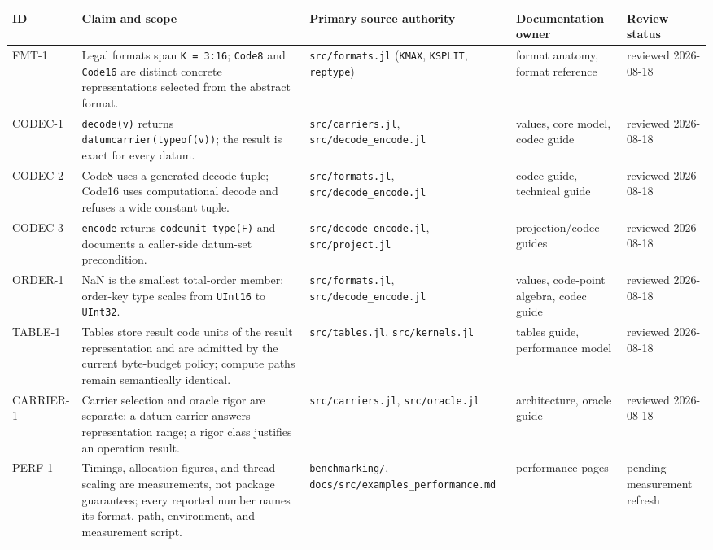 \begin{table}[h]
\centering
\begin{tabulary}{\linewidth}{L L L L L}
\toprule
ID & Claim and scope & Primary source authority & Documentation owner & Review status \\
\toprule
FMT-1 & Legal formats span \texttt{K = 3:16}; \texttt{Code8} and \texttt{Code16} are distinct concrete representations selected from the abstract format. & \texttt{src/formats.jl} (\texttt{KMAX}, \texttt{KSPLIT}, \texttt{reptype}) & format anatomy, format reference & reviewed 2026-08-18 \\
CODEC-1 & \texttt{decode(v)} returns \texttt{datumcarrier(typeof(v))}; the result is exact for every datum. & \texttt{src/carriers.jl}, \texttt{src/decode\_\allowbreak{}encode.jl} & values, core model, codec guide & reviewed 2026-08-18 \\
CODEC-2 & Code8 uses a generated decode tuple; Code16 uses computational decode and refuses a wide constant tuple. & \texttt{src/formats.jl}, \texttt{src/decode\_\allowbreak{}encode.jl} & codec guide, technical guide & reviewed 2026-08-18 \\
CODEC-3 & \texttt{encode} returns \texttt{codeunit\_\allowbreak{}type(F)} and documents a caller-side datum-set precondition. & \texttt{src/decode\_\allowbreak{}encode.jl}, \texttt{src/project.jl} & projection/codec guides & reviewed 2026-08-18 \\
ORDER-1 & NaN is the smallest total-order member; order-key type scales from \texttt{UInt16} to \texttt{UInt32}. & \texttt{src/formats.jl}, \texttt{src/decode\_\allowbreak{}encode.jl} & values, code-point algebra, codec guide & reviewed 2026-08-18 \\
TABLE-1 & Tables store result code units of the result representation and are admitted by the current byte-budget policy; compute paths remain semantically identical. & \texttt{src/tables.jl}, \texttt{src/kernels.jl} & tables guide, performance model & reviewed 2026-08-18 \\
CARRIER-1 & Carrier selection and oracle rigor are separate: a datum carrier answers representation range; a rigor class justifies an operation result. & \texttt{src/carriers.jl}, \texttt{src/oracle.jl} & architecture, oracle guide & reviewed 2026-08-18 \\
PERF-1 & Timings, allocation figures, and thread scaling are measurements, not package guarantees; every reported number names its format, path, environment, and measurement script. & \texttt{benchmarking/}, \texttt{docs/\allowbreak{}src/\allowbreak{}examples\_\allowbreak{}performance.md} & performance pages & pending measurement refresh \\
\bottomrule
\end{tabulary}

\end{table}



